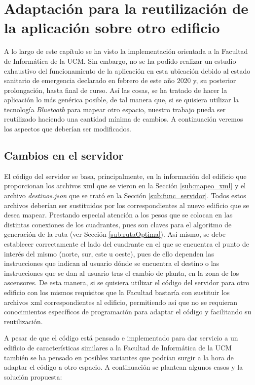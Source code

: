 \section{Adaptación para la reutilización de la aplicación sobre otro edificio}

A lo largo de este capítulo se ha visto la implementación orientada a la Facultad de Informática de la UCM. Sin embargo, no se ha podido realizar un estudio exhaustivo del funcionamiento de la aplicación en esta ubicación debido al estado sanitario de emergencia declarado en febrero de este año 2020 y, su posterior prolongación, hasta final de curso. Así las cosas, se ha tratado de hacer la aplicación lo más genérica posible, de tal manera que, si se quisiera utilizar la tecnología \textit{Bluetooth} para mapear otro espacio, nuestro trabajo pueda ser reutilizado haciendo una cantidad mínima de cambios. A continuación veremos los aspectos que deberían ser modificados.

\subsection{Cambios en el servidor}

El código del servidor se basa, principalmente, en la información del edificio que proporcionan los archivos xml que se vieron en la Sección \ref{sub:mapeo_xml} y el archivo \textit{destinos.json} que se trató en la Sección \ref{sub:func_servidor}. Todos estos archivos deberían ser sustituidos por los correspondientes al nuevo edificio que se desea mapear. Prestando especial atención a los pesos que se colocan en las distintas conexiones de los cuadrantes, pues son claves para el algoritmo de generación de la ruta (ver Sección \ref{sub:rutaOptima}). Así mismo, se debe establecer correctamente el lado del cuadrante en el que se encuentra el punto de interés del mismo (norte, sur, este u oeste), pues de ello dependen las instrucciones que indican al usuario dónde se encuentra el destino o las instrucciones que se dan al usuario tras el cambio de planta, en la zona de los ascensores. De esta manera, si se quisiera utilizar el código del servidor para otro edificio con los mismos requisitos que la Facultad bastaría con sustituir los archivos xml correspondientes al edificio, permitiendo así que no se requieran conocimientos específicos de programación para adaptar el código y facilitando su reutilización.

A pesar de que el código está pensado e implementado para dar servicio a un edificio de características similares a la Facultad de Informática de la UCM también se ha pensado en posibles variantes que podrían surgir a la hora de adaptar el código a otro espacio. A continuación se plantean algunos casos y la solución propuesta: 

